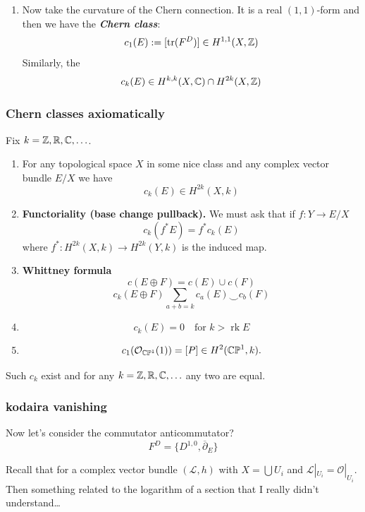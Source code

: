 \begin{enumerate}
\begin{defn}
		 Connection $D$ is \textit{\textbf{hermitian}} when
		\[h(s,s)=h(Ds,s)+h(s,Ds).\]
	 \end{defn}
	 Ahora s\'i,
	 \begin{thm}[Chern]
	 	For every hermitian vector bundle $(E,h)$ there exists a unique Hermitian connection $D$ such that
		\[D^{0,1}=\overline{\partial}_E\]
	 \end{thm}
 \item Now take the curvature of the Chern connection. It is a real $(1,1)$-form and then we have the \textit{\textbf{Chern class}}:
	 \[c_1(E):=[\operatorname{tr}(F^D)]\in H^{1,1}(X,\mathbb{Z})\]Similarly, the
	 \[c_k(E)\in H^{k,k}(X,\mathbb{C})\cap H^{2k}(X,\mathbb{Z})\]
\end{enumerate}
\subsubsection{Chern classes axiomatically}\label{ssec:Chern classes axiomatically}
Fix $k=\mathbb{Z},\mathbb{R},\mathbb{C},\ldots$.
\begin{enumerate}
	\item For any topological space $X$ in some nice class and any complex vector bundle $E/X$ we have
		\[c_k(E)\in H^{2k}(X,k)\]
\item \textbf{Functoriality (base change pullback).} We must ask that if $f:Y\to E/X$ 
\[c_k(f^*E)=f^*c_k(E)\]
where $f^*:H^{2k}(X,k)\to H^{2k}(Y,k)$ is the induced map.
\item \textbf{Whittney formula}\[c(E\oplus F)=c(E)\cup c(F)\]
	\[c_k(E\oplus F)\sum_{a+b=k} c_a(E)\smile c_b(F)\]
\item \[c_k(E)=0\quad \text{for } k>\operatorname{rk}E\]
\item \[c_1(\mathcal{O}_{\mathbb{C}\mathbb{P}^1}(1))=[P]\in H^{2}(\mathbb{C}\mathbb{P}^1,k).\]
\end{enumerate}
	
\begin{thm}
	Such $c_k$ exist and for any $k=\mathbb{Z},\mathbb{R},\mathbb{C},\ldots$ any two are equal.
\end{thm}
\subsubsection{kodaira vanishing}\label{sec:kodaira-vanishing}
Now let's consider the commutator {\color{magenta}anticommutator?}
\[F^D=\{D^{1,0},\overline{\partial}_E\}\]
\begin{remark}
	Recall that for a complex vector bundle $(\mathcal{L},h)$ with $X=\bigcup U_i$ and $\mathcal{L}|_{U_i}=\mathcal{O}|_{U_i}$. {\color{magenta}Then something related to the logarithm of a section that I really didn't understand…}
\end{remark}

